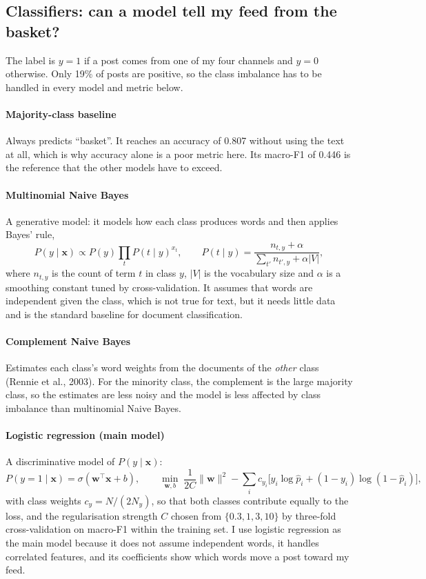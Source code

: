 \documentclass[11pt,a4paper]{article}
\begin{document}
\subsection{Classifiers: can a model tell my feed from the basket?}
The label is $y=1$ if a post comes from one of my four channels and $y=0$ otherwise. Only 19\% of posts are positive, so the class imbalance has to be handled in every model and metric below.

\paragraph{Majority-class baseline} Always predicts ``basket''. It reaches an accuracy of 0.807 without using the text at all, which is why accuracy alone is a poor metric here. Its macro-F1 of 0.446 is the reference that the other models have to exceed.

\paragraph{Multinomial Naive Bayes} A generative model: it models how each class produces words and then applies Bayes' rule,
\begin{equation}
P(y \mid \mathbf{x}) \propto P(y)\prod_{t} P(t \mid y)^{x_t}, \qquad P(t\mid y) = \frac{n_{t,y}+\alpha}{\sum_{t'} n_{t',y} + \alpha |V|},
\end{equation}
where $n_{t,y}$ is the count of term $t$ in class $y$, $|V|$ is the vocabulary size and $\alpha$ is a smoothing constant tuned by cross-validation. It assumes that words are independent given the class, which is not true for text, but it needs little data and is the standard baseline for document classification.

\paragraph{Complement Naive Bayes} Estimates each class's word weights from the documents of the \emph{other} class (Rennie et al., 2003). For the minority class, the complement is the large majority class, so the estimates are less noisy and the model is less affected by class imbalance than multinomial Naive Bayes.

\paragraph{Logistic regression (main model)} A discriminative model of $P(y\mid\mathbf{x})$:
\begin{equation}
P(y=1\mid\mathbf{x}) = \sigma(\mathbf{w}^\top\mathbf{x}+b), \qquad
\min_{\mathbf{w},b}\; \frac{1}{2C}\lVert\mathbf{w}\rVert^2 - \sum_i c_{y_i}\Big[y_i\log \hat p_i + (1-y_i)\log(1-\hat p_i)\Big],
\end{equation}
with class weights $c_y = N/(2N_y)$, so that both classes contribute equally to the loss, and the regularisation strength $C$ chosen from $\{0.3, 1, 3, 10\}$ by three-fold cross-validation on macro-F1 within the training set. I use logistic regression as the main model because it does not assume independent words, it handles correlated features, and its coefficients show which words move a post toward my feed.
\end{document}
